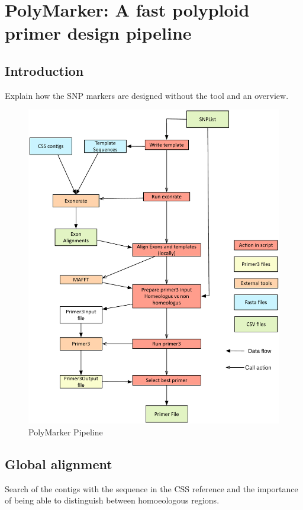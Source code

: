 
\chapter{PolyMarker: A fast polyploid primer design pipeline}
\section{Introduction} 
Explain how the SNP markers are designed without the tool and an overview. 


\begin{figure}
\includegraphics[width=1\textwidth]{PolyMarker/Figures/pipeline.pdf}
        \caption{PolyMarker Pipeline}
        \label{fig:poly:pipeline}
\end{figure}




\section{Global alignment} 
Search of the contigs with the sequence in the CSS reference and the importance of being able to distinguish between homoeologous regions. 


